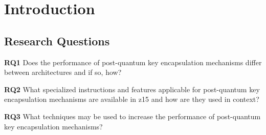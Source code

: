 \chapter{Introduction}
\label{chapter:introduction}


\section{Research Questions}
\label{section:introduction:research-questions}

\noindent\textbf{RQ1} Does the performance of \gls{post-quantum} key encapsulation mechanisms differ between architectures and if so, how?\label{rq1}\hfill\par
\noindent\textbf{RQ2} What specialized instructions and features applicable for \gls{post-quantum} key encapsulation mechanisms are available in \gls{z15} and how are they used in context?\label{rq2}\hfill\par
\noindent\textbf{RQ3} What techniques may be used to increase the performance of \gls{post-quantum} key encapsulation mechanisms?\label{rq3}\hfill\par

